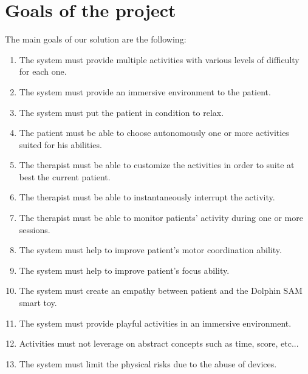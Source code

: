 \section{Goals of the project}
The main goals of our solution are the following:
\begin{enumerate}
	\item The system must provide multiple activities with various levels of difficulty for each one.
	\item The system must provide an immersive environment to the patient. 
	\item The system must put the patient in condition to relax.
	\item The patient must be able to choose autonomously one or more activities suited for his abilities.
	\item The therapist must be able to customize the activities in order to suite at best the current patient.
	\item The therapist must be able to instantaneously interrupt the activity.
	\item The therapist must be able to monitor patients’ activity during one or more sessions.
	\item The system must help to improve patient’s motor coordination ability.
	\item The system must help to improve patient’s focus ability.
	\item The system must create an empathy between patient and the Dolphin SAM smart toy.
	\item The system must provide playful activities in an immersive environment.
	\item Activities must not leverage on abstract concepts such as time, score, etc...
	\item The system must limit the physical risks due to the abuse of devices.
\end{enumerate}
